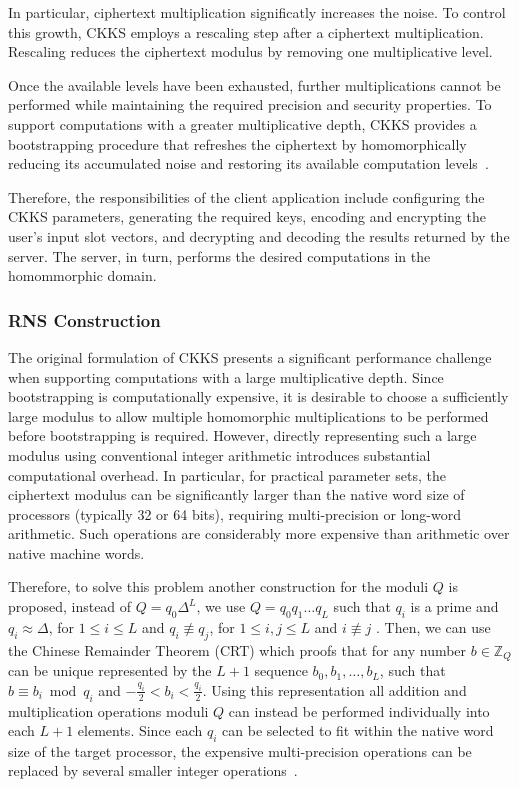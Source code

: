 In particular, ciphertext multiplication significatly increases the noise. To control this growth, CKKS employs a rescaling step after a ciphertext multiplication. Rescaling reduces the ciphertext modulus by removing one multiplicative level.

Once the available levels have been exhausted, further multiplications cannot be performed while maintaining the required precision and security properties. To support computations with a greater multiplicative depth, CKKS provides a bootstrapping procedure that refreshes the ciphertext by homomorphically reducing its accumulated noise and restoring its available computation levels~\cite{cheon2018bootstrapping}.

Therefore, the responsibilities of the client application include configuring the CKKS parameters, generating the required keys, encoding and encrypting the user's input slot vectors, and decrypting and decoding the results returned by the server. The server, in turn, performs the desired computations in the homommorphic domain.

\subsubsection{RNS Construction}

The original formulation of CKKS presents a significant performance challenge when supporting computations with a large multiplicative depth. Since bootstrapping is computationally expensive, it is desirable to choose a sufficiently large modulus to allow multiple homomorphic multiplications to be performed before bootstrapping is required. However, directly representing such a large modulus using conventional integer arithmetic introduces substantial computational overhead. In particular, for practical parameter sets, the ciphertext modulus can be significantly larger than the native word size of processors (typically 32 or 64 bits), requiring multi-precision or long-word arithmetic. Such operations are considerably more expensive than arithmetic over native machine words.

Therefore, to solve this problem another construction for the moduli $Q$ is proposed, instead of $Q=q_0\Delta^L$, we use $Q=q_0q_1\ldots q_L$ such that $q_i$ is a prime and $q_i\approx\Delta$, for $1\leq i\leq L$ and $q_i \not\equiv q_j$, for $1\leq i, j \leq L$ and $i \not\equiv j$ . Then, we can use the Chinese Remainder Theorem (CRT) which proofs that for any number $b\in\mathbb{Z}_Q$ can be unique represented by the $L+1$ sequence $b_0, b_1, \ldots, b_L$, such that $b \equiv b_i \bmod q_i$ and $-\frac{q_i}{2} < b_i < \frac{q_i}{2}$. Using this representation all addition and multiplication operations moduli $Q$ can instead be performed individually into each $L+1$ elements. Since each $q_i$ can be selected to fit within the native word size of the target processor, the expensive multi-precision operations can be replaced by several smaller integer operations~\cite{cheon2018faster}.

